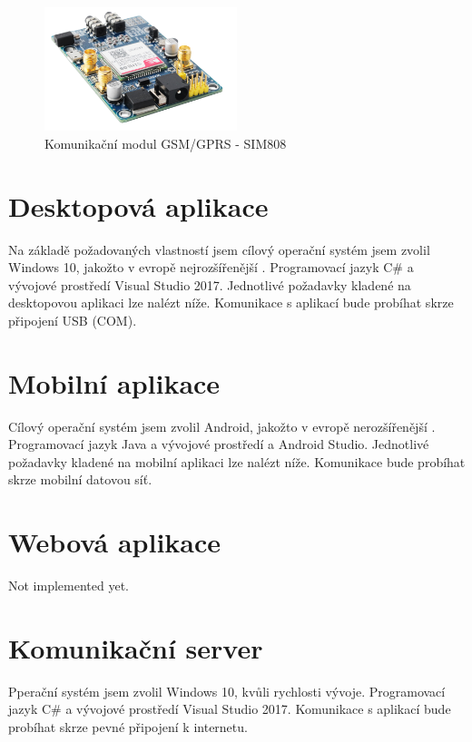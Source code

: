 \documentclass[FM,DP]{tulthesis}  %
\begin{document}
\begin{figure}[H]
\begin{center}
\includegraphics[width=0.5\textwidth]{images/gprs.png}
\caption{Komunikační modul GSM/GPRS - SIM808}
\label{image}
\end{center}
\end{figure}

\section{Desktopová aplikace}
Na základě požadovaných vlastností jsem cílový operační systém jsem zvolil Windows 10, jakožto v evropě nejrozšířenější \cite{DesktopMarketShare}. Programovací jazyk C\# a vývojové prostředí Visual Studio 2017. Jednotlivé požadavky kladené na desktopovou aplikaci lze nalézt níže. Komunikace s aplikací bude probíhat skrze připojení USB (COM).

\section{Mobilní aplikace}
Cílový operační systém jsem zvolil Android, jakožto v evropě nerozšířenější \cite{MobileMarketShare}. Programovací jazyk Java a vývojové prostředí a Android Studio. Jednotlivé požadavky kladené na mobilní aplikaci lze nalézt níže. Komunikace bude probíhat skrze mobilní datovou síť.

\section{Webová aplikace}
Not implemented yet.

\section{Komunikační server}
Pperační systém jsem zvolil Windows 10, kvůli rychlosti vývoje. Programovací jazyk C\# a vývojové prostředí Visual Studio 2017. Komunikace s aplikací bude probíhat skrze pevné připojení k internetu.

\end{document}
